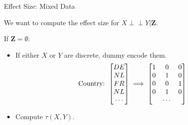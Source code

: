\documentclass{beamer}
\def\ci{\perp\!\!\!\!\!\perp}
\begin{document}
\begin{frame}{Effect Size: Mixed Data}
	\centerline{We want to compute the effect size for $ X \ci Y \rvert \bm{Z} $.}
	
	\vspace{1em}

	If $ \bm{Z} = \emptyset $:
	\begin{itemize}
		\item If either $ X $ or $ Y $ are discrete, dummy encode them.
			$$ \textnormal{Country: } \begin{bmatrix} DE \\
					   NL \\
				           FR \\
				           NL \\
					   \cdots
					   \end{bmatrix} \implies \begin{bmatrix} 1 & 0 & 0 \\
				   						  0 & 1 & 0 \\
									          0 & 0 & 1 \\
									          0 & 1 & 0 \\
										    & \cdots &
									  \end{bmatrix}$$
		\item Compute $ \tau(X, Y) $.
	\end{itemize}
\end{frame}
\end{document}

